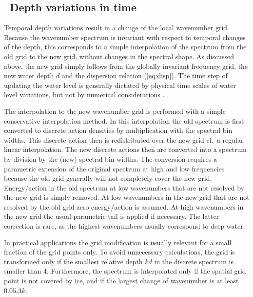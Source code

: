 \vssub
\subsection{~Depth variations in time} \label{sub:num_depth}
\vssub

Temporal depth variations result in a change of the local wavenumber
grid. Because the wavenumber spectrum is invariant with respect to temporal
changes of the depth, this corresponds to a simple interpolation of the
spectrum from the old grid to the new grid, without changes in the spectral
shape. As discussed above, the new grid simply follows from the globally
invariant frequency grid, the new water depth $d$ and the dispersion relation
(\ref{eq:disp}). The time step of updating the water level is generally
dictated by physical time scales of water level variations, but not by
numerical considerations \citep{tol:GAOS98b}.

The interpolation to the new wavenumber grid is performed with a simple
conservative interpolation method. In this interpolation the old spectrum is
first converted to discrete action densities by multiplication with the
spectral bin widths. This discrete action then is redistributed over the new
grid cf.\ a regular linear interpolation. The new discrete actions then are
converted into a spectrum by division by the (new) spectral bin widths. The
conversion requires a parametric extension of the original spectrum at high
and low frequencies because the old grid generally will not completely cover
the new grid. Energy/action in the old spectrum at low wavenumbers that are
not resolved by the new grid is simply removed. At low wavenumbers in the new
grid that are not resolved by the old grid zero energy/action is assumed. At
high wavenumbers in the new grid the usual parametric tail is applied if
necessary. The latter correction is rare, as the highest wavenumbers usually
correspond to deep water.

In practical applications the grid modification is usually relevant for a
small fraction of the grid points only. To avoid unnecessary calculations, the
grid is transformed only if the smallest relative depth $kd$ in the discrete
spectrum is smaller than 4. Furthermore, the spectrum is interpolated only if
the spatial grid point is not covered by ice, and if the largest change of
wavenumber is at least $0.05 \Delta k$.
